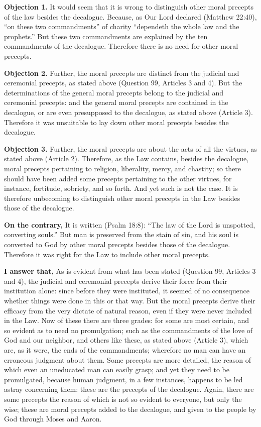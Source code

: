 
\textbf{Objection 1.} It would seem that it is wrong to distinguish other moral precepts of the law besides the decalogue. Because, as Our Lord declared (Matthew 22:40), ``on these two commandments'' of charity ``dependeth the whole law and the prophets.'' But these two commandments are explained by the ten commandments of the decalogue. Therefore there is no need for other moral precepts.

\textbf{Objection 2.} Further, the moral precepts are distinct from the judicial and ceremonial precepts, as stated above (Question 99, Articles 3 and 4). But the determinations of the general moral precepts belong to the judicial and ceremonial precepts: and the general moral precepts are contained in the decalogue, or are even presupposed to the decalogue, as stated above (Article 3). Therefore it was unsuitable to lay down other moral precepts besides the decalogue.

\textbf{Objection 3.} Further, the moral precepts are about the acts of all the virtues, as stated above (Article 2). Therefore, as the Law contains, besides the decalogue, moral precepts pertaining to religion, liberality, mercy, and chastity; so there should have been added some precepts pertaining to the other virtues, for instance, fortitude, sobriety, and so forth. And yet such is not the case. It is therefore unbecoming to distinguish other moral precepts in the Law besides those of the decalogue.

\textbf{On the contrary,} It is written (Psalm 18:8): ``The law of the Lord is unspotted, converting souls.'' But man is preserved from the stain of sin, and his soul is converted to God by other moral precepts besides those of the decalogue. Therefore it was right for the Law to include other moral precepts.

\textbf{I answer that,} As is evident from what has been stated (Question 99, Articles 3 and 4), the judicial and ceremonial precepts derive their force from their institution alone: since before they were instituted, it seemed of no consequence whether things were done in this or that way. But the moral precepts derive their efficacy from the very dictate of natural reason, even if they were never included in the Law. Now of these there are three grades: for some are most certain, and so evident as to need no promulgation; such as the commandments of the love of God and our neighbor, and others like these, as stated above (Article 3), which are, as it were, the ends of the commandments; wherefore no man can have an erroneous judgment about them. Some precepts are more detailed, the reason of which even an uneducated man can easily grasp; and yet they need to be promulgated, because human judgment, in a few instances, happens to be led astray concerning them: these are the precepts of the decalogue. Again, there are some precepts the reason of which is not so evident to everyone, but only the wise; these are moral precepts added to the decalogue, and given to the people by God through Moses and Aaron.

